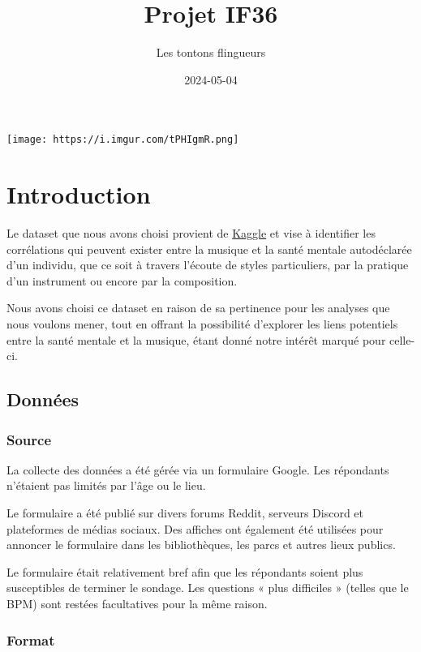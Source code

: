 \documentclass[
]{article}
\title{Projet IF36}
\author{Les tontons flingueurs}
\date{2024-05-04}
\begin{document}
\maketitle

\texttt{[image: https://i.imgur.com/tPHIgmR.png]}

\hypertarget{introduction}{%
\section{Introduction}\label{introduction}}

Le dataset que nous avons choisi provient de
\href{https://www.kaggle.com/datasets/catherinerasgaitis/mxmh-survey-results/data}{Kaggle}
et vise à identifier les corrélations qui peuvent exister entre la
musique et la santé mentale autodéclarée d'un individu, que ce soit à
travers l'écoute de styles particuliers, par la pratique d'un instrument
ou encore par la composition.

Nous avons choisi ce dataset en raison de sa pertinence pour les
analyses que nous voulons mener, tout en offrant la possibilité
d'explorer les liens potentiels entre la santé mentale et la musique,
étant donné notre intérêt marqué pour celle-ci.

\hypertarget{donnuxe9es}{%
\subsection{Données}\label{donnuxe9es}}

\hypertarget{source}{%
\subsubsection{Source}\label{source}}

La collecte des données a été gérée via un formulaire Google. Les
répondants n'étaient pas limités par l'âge ou le lieu.

Le formulaire a été publié sur divers forums Reddit, serveurs Discord et
plateformes de médias sociaux. Des affiches ont également été utilisées
pour annoncer le formulaire dans les bibliothèques, les parcs et autres
lieux publics.

Le formulaire était relativement bref afin que les répondants soient
plus susceptibles de terminer le sondage. Les questions « plus
difficiles » (telles que le BPM) sont restées facultatives pour la même
raison.

\hypertarget{format}{%
\subsubsection{Format}\label{format}}
\end{document}
